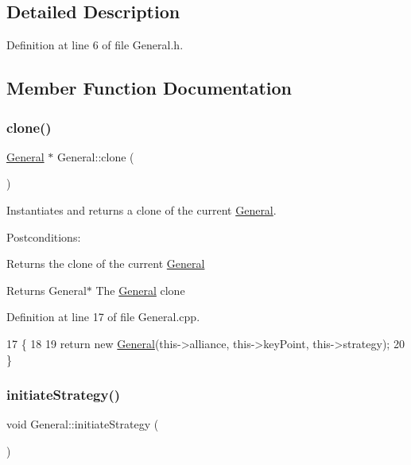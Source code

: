 \subsection{Detailed Description}


Definition at line 6 of file General.\+h.



\subsection{Member Function Documentation}
\mbox{\label{classGeneral_a6c73103d464cf8f3ed95deea76d788d5}} 
\subsubsection{\texorpdfstring{clone()}{clone()}}
{\footnotesize\ttfamily \hyperlink{classGeneral}{General} $\ast$ General\+::clone (\begin{DoxyParamCaption}{ }\end{DoxyParamCaption})}



Instantiates and returns a clone of the current \hyperlink{classGeneral}{General}. 

Postconditions\+:
\begin{DoxyItemize}
\item Returns the clone of the current \hyperlink{classGeneral}{General}
\end{DoxyItemize}

\begin{DoxyReturn}{Returns}
General$\ast$ The \hyperlink{classGeneral}{General} clone 
\end{DoxyReturn}


Definition at line 17 of file General.\+cpp.


\begin{DoxyCode}
17                         \{
18 
19     \textcolor{keywordflow}{return} \textcolor{keyword}{new} \hyperlink{classGeneral}{General}(this->alliance, this->keyPoint, this->strategy);
20 \}
\end{DoxyCode}
\mbox{\label{classGeneral_a449172bcf1b4bf8b9a47af6b4e435d7e}} 
\subsubsection{\texorpdfstring{initiate\+Strategy()}{initiateStrategy()}}
{\footnotesize\ttfamily void General\+::initiate\+Strategy (\begin{DoxyParamCaption}{ }\end{DoxyParamCaption})}



